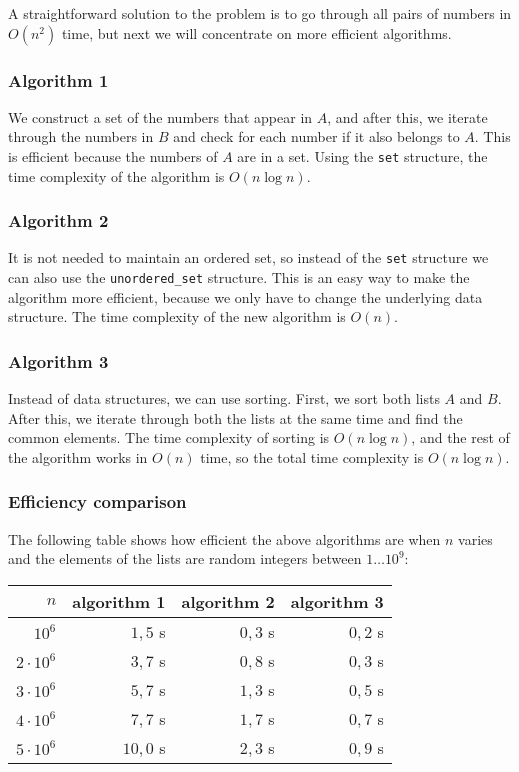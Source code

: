 A straightforward solution to the problem is
to go through all pairs of numbers in $O(n^2)$ time,
but next we will concentrate on
more efficient algorithms.

\subsubsection{Algorithm 1}

We construct a set of the numbers that appear in $A$,
and after this, we iterate through the numbers
in $B$ and check for each number if it
also belongs to $A$.
This is efficient because the numbers of $A$
are in a set.
Using the \texttt{set} structure,
the time complexity of the algorithm is $O(n \log n)$.

\subsubsection{Algorithm 2}

It is not needed to maintain an ordered set,
so instead of the \texttt{set} structure
we can also use the \texttt{unordered\_set} structure.
This is an easy way to make the algorithm
more efficient, because we only have to change
the underlying data structure.
The time complexity of the new algorithm is $O(n)$.

\subsubsection{Algorithm 3}

Instead of data structures, we can use sorting.
First, we sort both lists $A$ and $B$.
After this, we iterate through both the lists
at the same time and find the common elements.
The time complexity of sorting is $O(n \log n)$,
and the rest of the algorithm works in $O(n)$ time,
so the total time complexity is $O(n \log n)$.

\subsubsection{Efficiency comparison}

The following table shows how efficient
the above algorithms are when $n$ varies and
the elements of the lists are random
integers between $1 \ldots 10^9$:

\begin{center}
\begin{tabular}{rrrr}
$n$ & algorithm 1 & algorithm 2 & algorithm 3 \\
\hline
$10^6$ & $1{,}5$ s & $0{,}3$ s & $0{,}2$ s \\
$2 \cdot 10^6$ & $3{,}7$ s & $0{,}8$ s & $0{,}3$ s \\
$3 \cdot 10^6$ & $5{,}7$ s & $1{,}3$ s & $0{,}5$ s \\
$4 \cdot 10^6$ & $7{,}7$ s & $1{,}7$ s & $0{,}7$ s \\
$5 \cdot 10^6$ & $10{,}0$ s & $2{,}3$ s & $0{,}9$ s \\
\end{tabular}
\end{center}


